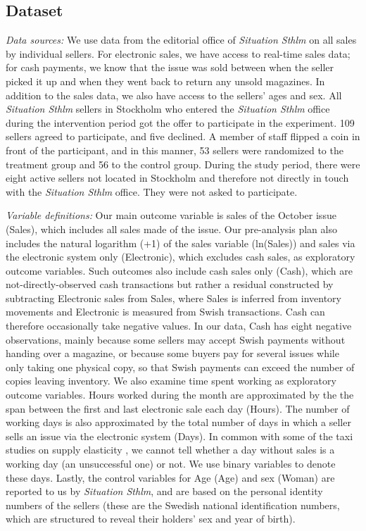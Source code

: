 \documentclass[12pt]{article}
\begin{document}
\subsection{Dataset}
\textit{Data sources:} We use data from the editorial office of \textit{Situation Sthlm} on all sales by individual sellers. For electronic sales, we have access to real-time sales data; for cash payments, we know that the issue was sold between when the seller picked it up and when they went back to return any unsold magazines. In addition to the sales data, we also have access to the sellers' ages and sex. All \textit{Situation Sthlm} sellers in Stockholm who entered the \textit{Situation Sthlm} office during the intervention period got the offer to participate in the experiment. 109 sellers agreed to participate, and five declined. A member of staff flipped a coin in front of the participant, and in this manner, 53 sellers were randomized to the treatment group and 56 to the control group. During the study period, there were eight active sellers not located in Stockholm and therefore not directly in touch with the \textit{Situation Sthlm} office. They were not asked to participate.

\textit{Variable definitions:} Our main outcome variable is sales of the October issue (Sales), which includes all sales made of the issue. Our pre-analysis plan also includes the natural logarithm (+1) of the sales variable (ln(Sales)) and sales via the electronic system only (Electronic), which excludes cash sales, as exploratory outcome variables. Such outcomes also include cash sales only (Cash), which are not-directly-observed cash transactions but rather a residual constructed by subtracting Electronic sales from Sales, where Sales is inferred from inventory movements and Electronic is measured from Swish transactions. Cash can therefore occasionally take negative values. In our data, Cash has eight negative observations, mainly because some sellers may accept Swish payments without handing over a magazine, or because some buyers pay for several issues while only taking one physical copy, so that Swish payments can exceed the number of copies leaving inventory. We also examine time spent working as exploratory outcome variables. Hours worked during the month are approximated by the the span between the first and last electronic sale each day (Hours). The number of working days is also approximated by the total number of days in which a seller sells an issue via the electronic system (Days). In common with some of the taxi studies on supply elasticity \citep[e.g.,][]{camerer1997labor,farber2005tomorrow,crawford2011newyork}, we cannot tell whether a day without sales is a working day (an unsuccessful one) or not. We use binary variables to denote these days. Lastly, the control variables for Age (Age) and sex (Woman) are reported to us by \textit{Situation Sthlm}, and are based on the personal identity numbers of the sellers (these are the Swedish national identification numbers, which are structured to reveal their holders’ sex and year of birth).
\end{document}
